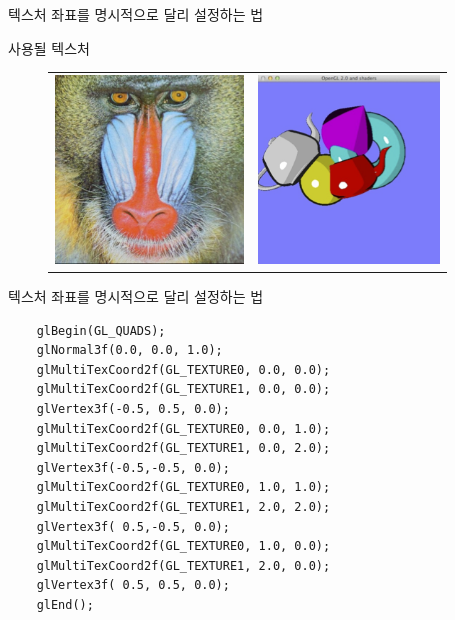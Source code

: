 \documentclass{beamer}
\begin{document}
\begin{frame}[fragile]{텍스처 좌표를 명시적으로 달리 설정하는 법}

사용될 텍스처
\begin{figure}[h!]
  \centering
	\begin{tabular}{cc}
	\includegraphics[height=5cm]{OGL_texture/multiTex2A.png} &
	\includegraphics[height=5cm]{OGL_texture/multiTex2B.png}  \\
	\end{tabular}
\end{figure}

\end{frame}


\begin{frame}[fragile]{텍스처 좌표를 명시적으로 달리 설정하는 법}

\lstset{language=C++} 
\begin{lstlisting}
	glBegin(GL_QUADS);
	glNormal3f(0.0, 0.0, 1.0);
	glMultiTexCoord2f(GL_TEXTURE0, 0.0, 0.0);
	glMultiTexCoord2f(GL_TEXTURE1, 0.0, 0.0);
	glVertex3f(-0.5, 0.5, 0.0);
	glMultiTexCoord2f(GL_TEXTURE0, 0.0, 1.0);
	glMultiTexCoord2f(GL_TEXTURE1, 0.0, 2.0);
	glVertex3f(-0.5,-0.5, 0.0);
	glMultiTexCoord2f(GL_TEXTURE0, 1.0, 1.0);
	glMultiTexCoord2f(GL_TEXTURE1, 2.0, 2.0);
	glVertex3f( 0.5,-0.5, 0.0);
	glMultiTexCoord2f(GL_TEXTURE0, 1.0, 0.0);
	glMultiTexCoord2f(GL_TEXTURE1, 2.0, 0.0);
	glVertex3f( 0.5, 0.5, 0.0);
	glEnd();
\end{lstlisting}

\end{frame}
\end{document}
